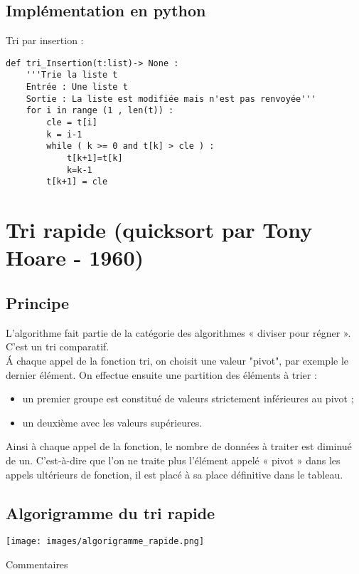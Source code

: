 \documentclass[t,11pt]{article}
\begin{document}
\vspace{-0.2cm}
\subsection{Implémentation en python}
\vspace{-0.2cm}

Tri par insertion :
\begin{lstlisting}
def tri_Insertion(t:list)-> None :
	'''Trie la liste t
	Entrée : Une liste t
	Sortie : La liste est modifiée mais n'est pas renvoyée'''
	for i in range (1 , len(t)) :
		cle = t[i]
		k = i-1
		while ( k >= 0 and t[k] > cle ) :
			t[k+1]=t[k]
			k=k-1
		t[k+1] = cle
\end{lstlisting}

\section{Tri rapide (quicksort par Tony Hoare - 1960)}
\subsection{Principe}
\noindent
L'algorithme fait partie de la catégorie des algorithmes « diviser pour régner ». C'est un tri comparatif.\\
\'A chaque appel de la fonction tri, on choisit une valeur "pivot", par exemple le dernier élément.
On effectue ensuite une partition des éléments à trier :
\begin{itemize}
\item un premier groupe est constitué de valeurs strictement inférieures au pivot ;
\item un deuxième avec les valeurs supérieures.
\end{itemize}
Ainsi à chaque appel de la fonction, le nombre de données à traiter est diminué de un. C'est-à-dire que l'on ne traite plus l'élément appelé « pivot » dans les appels ultérieurs de fonction, il est placé à sa place définitive dans le tableau.

\subsection{Algorigramme du tri rapide}

\begin{minipage}{.5\textwidth}%
\begin{center}
\texttt{[image: images/algorigramme\_rapide.png]}
\end{center}
\end{minipage}%
\hfill
\begin{minipage}{.45\textwidth}%
\vspace*{0.6cm}
\begin{python}
Commentaires
\vspace*{13cm}
\end{python}
\end{minipage}
\end{document}
